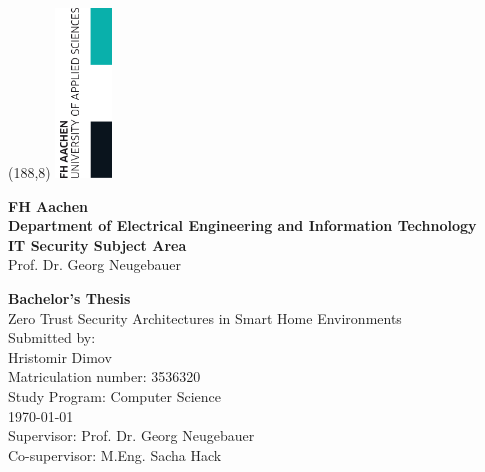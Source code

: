 \thispagestyle{empty}%
\setlength{\oddsidemargin}{0cm}%
\enlargethispage{\baselineskip}
\begin{textblock}{16}(188,8)%
    \includegraphics[width=1.5cm]{Images/fh_logo_rechts.png}%
 \end{textblock}%
\vspace*{-1.0cm}
\LARGE\textbf{FH Aachen}\\
\Large\textbf{Department of Electrical Engineering and Information Technology}\\
\large\textbf{IT Security Subject Area}\\
\large Prof. Dr. Georg Neugebauer
\vspace{2cm}
\begin{center}
	\LARGE\textbf{Bachelor's Thesis}\\
	\vspace{1.5cm}
	\LARGE Zero Trust Security Architectures in Smart Home Environments\\
	\large
	\vspace{1.5cm}
	Submitted by:\\
	Hristomir Dimov\\
	Matriculation number: 3536320\\
	\vspace{1.5cm}
	Study Program: Computer Science\\
	\vspace{1.5cm}
	\today\\
	\vspace{1.5cm}
	Supervisor: Prof. Dr. Georg Neugebauer\\
	Co-supervisor: M.Eng. Sacha Hack 
\end{center}